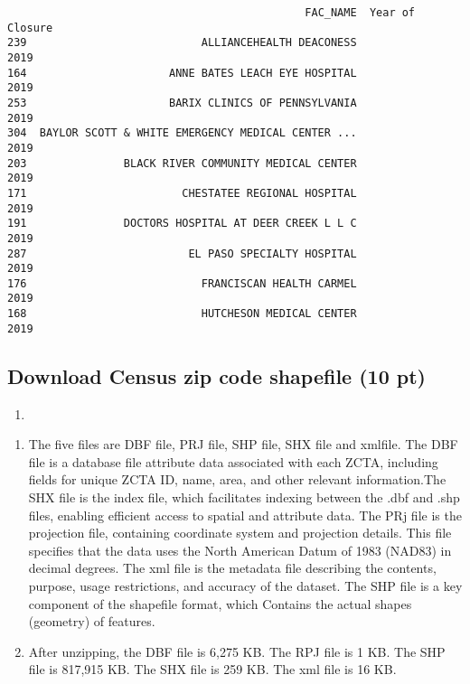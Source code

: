 \documentclass[
  letterpaper,
  DIV=11,
  numbers=noendperiod]{scrartcl}
\providecommand{\tightlist}{%
  \setlength{\itemsep}{0pt}\setlength{\parskip}{0pt}}\usepackage{longtable,booktabs,array}
\begin{document}
\begin{verbatim}
                                              FAC_NAME  Year of Closure
239                           ALLIANCEHEALTH DEACONESS             2019
164                      ANNE BATES LEACH EYE HOSPITAL             2019
253                      BARIX CLINICS OF PENNSYLVANIA             2019
304  BAYLOR SCOTT & WHITE EMERGENCY MEDICAL CENTER ...             2019
203               BLACK RIVER COMMUNITY MEDICAL CENTER             2019
171                        CHESTATEE REGIONAL HOSPITAL             2019
191               DOCTORS HOSPITAL AT DEER CREEK L L C             2019
287                         EL PASO SPECIALTY HOSPITAL             2019
176                           FRANCISCAN HEALTH CARMEL             2019
168                           HUTCHESON MEDICAL CENTER             2019
\end{verbatim}

\subsection{Download Census zip code shapefile (10
pt)}\label{download-census-zip-code-shapefile-10-pt}

\begin{enumerate}
\def\labelenumi{\arabic{enumi}.}
\tightlist
\item
\end{enumerate}

\begin{enumerate}
\def\labelenumi{\alph{enumi}.}
\item
  The five files are DBF file, PRJ file, SHP file, SHX file and xmlfile.
  The DBF file is a database file attribute data associated with each
  ZCTA, including fields for unique ZCTA ID, name, area, and other
  relevant information.The SHX file is the index file, which facilitates
  indexing between the .dbf and .shp files, enabling efficient access to
  spatial and attribute data. The PRj file is the projection file,
  containing coordinate system and projection details. This file
  specifies that the data uses the North American Datum of 1983 (NAD83)
  in decimal degrees. The xml file is the metadata file describing the
  contents, purpose, usage restrictions, and accuracy of the dataset.
  The SHP file is a key component of the shapefile format, which
  Contains the actual shapes (geometry) of features.
\item
  After unzipping, the DBF file is 6,275 KB. The RPJ file is 1 KB. The
  SHP file is 817,915 KB. The SHX file is 259 KB. The xml file is 16 KB.
\end{enumerate}
\end{document}
